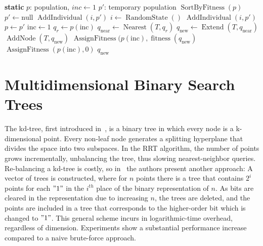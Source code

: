 \begin{algorithm}[ht!]
\caption{$\operatorname{ExtendToTarget}(T)$}
\label{alg:extendtotarget}
\begin{algorithmic}[1]
    \STATE \textbf{static} $p$: population, \(inc \leftarrow 1\)
    \STATE \(p'\): temporary population
        \STATE \(\operatorname{SortByFitness}(p)\)
        \STATE \(p' \leftarrow  \text{null}\)
                \STATE \(\operatorname{AddIndividual}(i,p')\)
            \ELSE
                \STATE \(i \leftarrow  \operatorname{RandomState}()\)
                \STATE \(\operatorname{AddIndividual}(i,p')\)
            \ENDIF
        \ENDFOR
        \STATE \(p \leftarrow  p'\)
        \STATE \(\text{inc} \leftarrow  1\)
    \ENDIF
    \STATE \(q_r \leftarrow  p(\text{inc})\)
    \STATE \(q_{\text{near}} \leftarrow   \operatorname{Nearest}(T,q_r)\)
    \STATE \(q_{\text{new}} \leftarrow  \operatorname{Extend}(T,q_{\text{near}})\)
        \STATE \(\operatorname{AddNode}(T,q_{\text{new}})\)
        \STATE \(\operatorname{AssignFitness}(p(\text{inc}),\operatorname{fitness}(q_{\text{new}})\)
    \ELSE
        \STATE \(\operatorname{AssignFitness}(p(\text{inc}),0)\)
    \ENDIF
    \RETURN \(q_{\text{new}}\)
\end{algorithmic}
\end{algorithm}

\section{Multidimensional Binary Search Trees}
\label{sec:kd-tree}
The kd-tree, first introduced in~\cite{Bentley75}, is a binary tree in which every 
node is a \mbox{k-dimensional} point. Every
non-leaf node generates a splitting hyperplane that divides the space into two
subspaces. In the RRT algorithm, the number of points grows incrementally,
unbalancing the tree, thus slowing nearest-neighbor queries. Re-balancing a kd-tree
is costly, so in~\cite{Atramentov02} the authors present another approach:
A vector of trees is constructed, where for $n$ points there is a tree that
contains $2^i$ points for each $"1"$ in the $i^{th}$ place of the binary
representation of $n$. As bits are cleared in the representation due to
increasing $n$, the trees are deleted, and the points are included in a tree
that corresponds to the higher-order bit which is changed to $"1"$. This general
scheme incurs in logarithmic-time overhead, regardless of dimension. Experiments
show a substantial performance increase compared to a naive brute-force approach.

